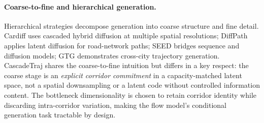 \paragraph{Coarse-to-fine and hierarchical generation.}
Hierarchical strategies decompose generation into coarse structure and fine detail.
Cardiff \citep{guo2025cardiff} uses cascaded hybrid diffusion at multiple spatial resolutions; DiffPath \citep{fan2024diffpath} applies latent diffusion for road-network paths; SEED \citep{rao2025seed} bridges sequence and diffusion models; GTG \citep{wang2025gtg} demonstrates cross-city trajectory generation.
CascadeTraj shares the coarse-to-fine intuition but differs in a key respect: the coarse stage is an \emph{explicit corridor commitment} in a capacity-matched latent space, not a spatial downsampling or a latent code without controlled information content.
The bottleneck dimensionality is chosen to retain corridor identity while discarding intra-corridor variation, making the flow model's conditional generation task tractable by design.
